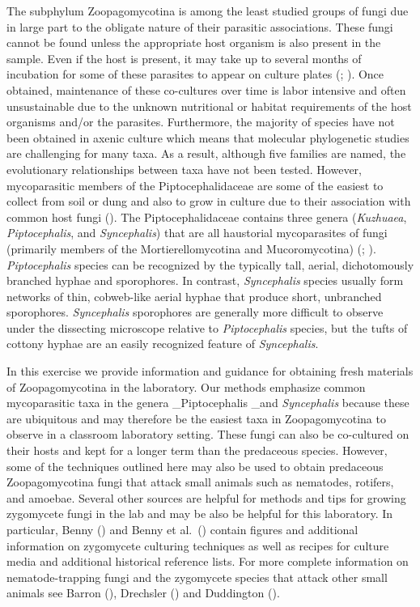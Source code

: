 \documentclass[]{book}
\begin{document}
The subphylum Zoopagomycotina is among the least studied groups of fungi due in large part to the obligate nature of their parasitic associations. These fungi cannot be found unless the appropriate host organism is also present in the sample. Even if the host is present, it may take up to several months of incubation for some of these parasites to appear on culture plates (\citet{Drechsler_1938}; \citet{Duddington_1955}). Once obtained, maintenance of these co-cultures over time is labor intensive and often unsustainable due to the unknown nutritional or habitat requirements of the host organisms and/or the parasites. Furthermore, the majority of species have not been obtained in axenic culture which means that molecular phylogenetic studies are challenging for many taxa. As a result, although five families are named, the evolutionary relationships between taxa have not been tested. However, mycoparasitic members of the Piptocephalidaceae are some of the easiest to collect from soil or dung and also to grow in culture due to their association with common host fungi (\citet{Benny_2016}). The Piptocephalidaceae contains three genera (\emph{Kuzhuaea}, \emph{Piptocephalis}, and \emph{Syncephalis}) that are all haustorial mycoparasites of fungi (primarily members of the Mortierellomycotina and Mucoromycotina) (\citet{Benjamin_1979}; \citet{Benny_2005}). \emph{Piptocephalis} species can be recognized by the typically tall, aerial, dichotomously branched hyphae and sporophores. In contrast, \emph{Syncephalis} species usually form networks of thin, cobweb-like aerial hyphae that produce short, unbranched sporophores. \emph{Syncephalis} sporophores are generally more difficult to observe under the dissecting microscope relative to \emph{Piptocephalis} species, but the tufts of cottony hyphae are an easily recognized feature of \emph{Syncephalis}.

In this exercise we provide information and guidance for obtaining fresh materials of Zoopagomycotina in the laboratory. Our methods emphasize common mycoparasitic taxa in the genera \_Piptocephalis \_and \emph{Syncephalis} because these are ubiquitous and may therefore be the easiest taxa in Zoopagomycotina to observe in a classroom laboratory setting. These fungi can also be co-cultured on their hosts and kept for a longer term than the predaceous species. However, some of the techniques outlined here may also be used to obtain predaceous Zoopagomycotina fungi that attack small animals such as nematodes, rotifers, and amoebae. Several other sources are helpful for methods and tips for growing zygomycete fungi in the lab and may be also be helpful for this laboratory. In particular, Benny (\citeyearpar{Benny_2008}) and Benny et al.~(\citet{Benny_2016}) contain figures and additional information on zygomycete culturing techniques as well as recipes for culture media and additional historical reference lists. For more complete information on nematode-trapping fungi and the zygomycete species that attack other small animals see Barron (\citet{Barron_2004}), Drechsler (\citet{Drechsler_1935A}) and Duddington (\citet{Duddington_1955}).
\end{document}
